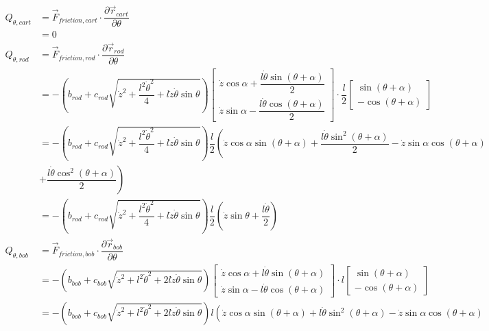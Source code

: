 \documentclass[12pt,a4paper,portrait]{article}
\begin{document}
	\begin{align*}
		Q_{\theta,cart} &= \vec{F}_{friction,cart} \cdot \dfrac{\partial \vec{r}_{cart}}{\partial \theta} \\
		&= 0\\
		Q_{\theta,rod} &= \vec{F}_{friction,rod} \cdot \dfrac{\partial \vec{r}_{rod}}{\partial \theta} \\
		&= -\left(b_{rod} + c_{rod}\sqrt{\dot{z}^2+\dfrac{l^2\dot{\theta}^2}{4}+l\dot{z}\dot{\theta}\sin{\theta}}\right)\begin{bmatrix}
			\dot{z}\cos{\alpha} + \dfrac{l\dot{\theta}\sin{(\theta+\alpha)}}{2}\\
			\dot{z}\sin{\alpha} - \dfrac{l\dot{\theta}\cos{(\theta+\alpha)}}{2}
		\end{bmatrix}\cdot\dfrac{l}{2}\begin{bmatrix}
		\sin{(\theta+\alpha)} \\
		-\cos{(\theta+\alpha)}
		\end{bmatrix} \\
		&= -\left(b_{rod} + c_{rod}\sqrt{\dot{z}^2+\dfrac{l^2\dot{\theta}^2}{4}+l\dot{z}\dot{\theta}\sin{\theta}}\right)\dfrac{l}{2}\left(\dot{z}\cos{\alpha}\sin{(\theta+\alpha)}+\dfrac{l\dot{\theta}\sin^2{(\theta+\alpha)}}{2} - \dot{z}\sin{\alpha}\cos{(\theta+\alpha)} \right.\\
		&\left.+ \dfrac{l\dot{\theta}\cos^2{(\theta+\alpha)}}{2}\right) \\
		&= -\left(b_{rod} + c_{rod}\sqrt{\dot{z}^2+\dfrac{l^2\dot{\theta}^2}{4}+l\dot{z}\dot{\theta}\sin{\theta}}\right)\dfrac{l}{2}\left(\dot{z}\sin{\theta}+\dfrac{l\dot{\theta}}{2}\right)\\
		Q_{\theta,bob} &= \vec{F}_{friction,bob} \cdot \dfrac{\partial \vec{r}_{bob}}{\partial \theta} \\
		&= -\left(b_{bob} + c_{bob}\sqrt{\dot{z}^2+l^2\dot{\theta}^2+2l\dot{z}\dot{\theta}\sin{\theta}}\right)\begin{bmatrix}
			\dot{z}\cos{\alpha} + l\dot{\theta}\sin{(\theta+\alpha)}\\
			\dot{z}\sin{\alpha} - l\dot{\theta}\cos{(\theta+\alpha)}
		\end{bmatrix} \cdot l\begin{bmatrix}
		\sin{(\theta+\alpha)} \\
		-\cos{(\theta+\alpha)}
		\end{bmatrix}\\
		&= -\left(b_{bob} + c_{bob}\sqrt{\dot{z}^2+l^2\dot{\theta}^2+2l\dot{z}\dot{\theta}\sin{\theta}}\right)l\left(\dot{z}\cos{\alpha}\sin{(\theta+\alpha)} + l\dot{\theta}\sin^2{(\theta+\alpha)}-\dot{z}\sin{\alpha}\cos{(\theta+\alpha)}\right. \\

\end{align*}
\end{document}
